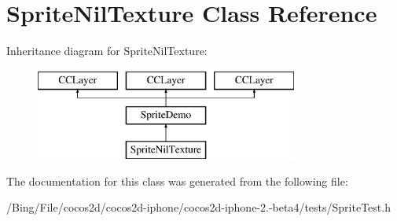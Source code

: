 \hypertarget{interface_sprite_nil_texture}{\section{Sprite\-Nil\-Texture Class Reference}
\label{interface_sprite_nil_texture}
}
Inheritance diagram for Sprite\-Nil\-Texture\-:\begin{figure}[H]
\begin{center}
\leavevmode
\includegraphics[height=3.000000cm]{interface_sprite_nil_texture}
\end{center}
\end{figure}


The documentation for this class was generated from the following file\-:\begin{DoxyCompactItemize}
\item 
/\-Bing/\-File/cocos2d/cocos2d-\/iphone/cocos2d-\/iphone-\/2.-\/beta4/tests/Sprite\-Test.\-h\end{DoxyCompactItemize}

